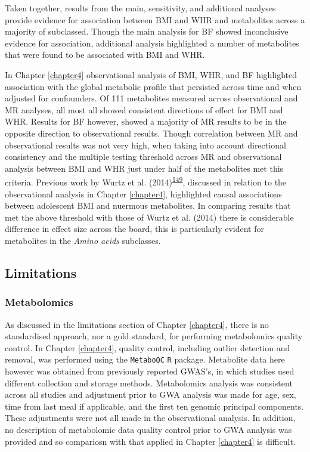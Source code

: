 \documentclass[11pt,twoside]{bristolthesis}
\begin{document}
Taken together, results from the main, sensitivity, and additional analyses provide evidence for association between BMI and WHR and metabolites across a majority of subclassed. Though the main analysis for BF showed inconclusive evidence for association, additional analysis highlighted a number of metabolites that were found to be associated with BMI and WHR.

In Chapter \ref{chapter4} observational analysis of BMI, WHR, and BF highlighted association with the global metabolic profile that persisted across time and when adjusted for confounders. Of 111 metabolites measured across observational and MR analyses, all most all showed consistent directions of effect for BMI and WHR. Results for BF however, showed a majority of MR results to be in the opposite direction to observational results. Though correlation between MR and observational results was not very high, when taking into account directional consistency and the multiple testing threshold across MR and observational analysis between BMI and WHR just under half of the metabolites met this criteria. Previous work by Wurtz et al. (2014)\textsuperscript{\protect\hyperlink{ref-Wurtz2014}{149}}, discussed in relation to the observational analysis in Chapter \ref{chapter4}, highlighted causal associations between adolescent BMI and nuermous metabolites. In comparing results that met the above threshold with those of Wurtz et al. (2014) there is considerable difference in effect size across the board, this is particularly evident for metabolites in the \emph{Amino acids} subclasses.

\hypertarget{limitations}{%
\subsection{Limitations}\label{limitations}}

\hypertarget{metabolomics}{%
\subsubsection{Metabolomics}\label{metabolomics}}

As discussed in the limitations section of Chapter \ref{chapter4}, there is no standardised approach, nor a gold standard, for performing metabolomics quality control. In Chapter \ref{chapter4}, quality control, including outlier detection and removal, was performed using the \texttt{MetaboQC} \texttt{R} package. Metabolite data here however was obtained from previously reported GWAS's, in which studies used different collection and storage methods. Metabolomics analysis was consistent across all studies and adjustment prior to GWA analysis was made for age, sex, time from last meal if applicable, and the first ten genomic principal components. These adjustments were not all made in the observational analysis. In addition, no description of metabolomic data quality control prior to GWA analysis was provided and so compariosn with that applied in Chapter \ref{chapter4} is difficult.
\end{document}
